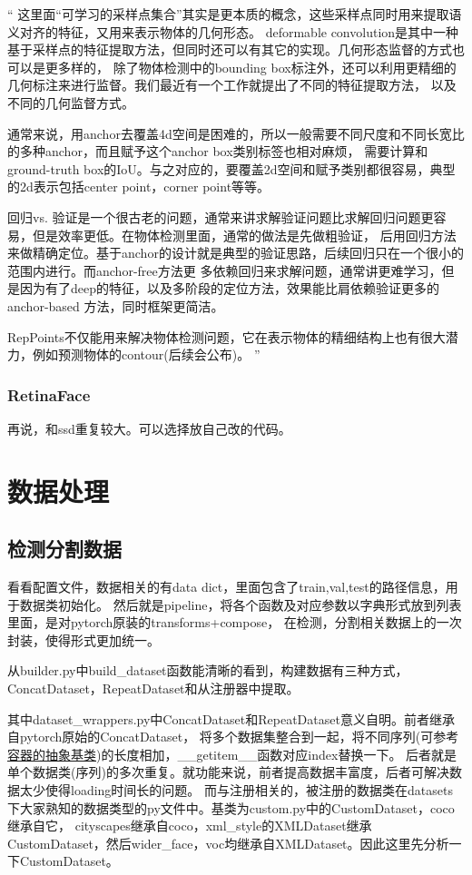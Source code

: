 \documentclass[UTF8]{ctexart}
\begin{document}
“
这里面“可学习的采样点集合”其实是更本质的概念，这些采样点同时用来提取语义对齐的特征，又用来表示物体的几何形态。
deformable convolution是其中一种基于采样点的特征提取方法，但同时还可以有其它的实现。几何形态监督的方式也可以是更多样的，
除了物体检测中的bounding box标注外，还可以利用更精细的几何标注来进行监督。我们最近有一个工作就提出了不同的特征提取方法，
以及不同的几何监督方式。

通常来说，用anchor去覆盖4d空间是困难的，所以一般需要不同尺度和不同长宽比的多种anchor，而且赋予这个anchor box类别标签也相对麻烦，
需要计算和ground-truth box的IoU。与之对应的，要覆盖2d空间和赋予类别都很容易，典型的2d表示包括center point，corner point等等。

回归vs. 验证是一个很古老的问题，通常来讲求解验证问题比求解回归问题更容易，但是效率更低。在物体检测里面，通常的做法是先做粗验证，
后用回归方法来做精确定位。基于anchor的设计就是典型的验证思路，后续回归只在一个很小的范围内进行。而anchor-free方法更
多依赖回归来求解问题，通常讲更难学习，但是因为有了deep的特征，以及多阶段的定位方法，效果能比肩依赖验证更多的anchor-based
方法，同时框架更简洁。

RepPoints不仅能用来解决物体检测问题，它在表示物体的精细结构上也有很大潜力，例如预测物体的contour(后续会公布)。
”


\subsubsection{RetinaFace}
再说，和ssd重复较大。可以选择放自己改的代码。

\section{数据处理}
\label{sec:detail}
\subsection{检测分割数据}
看看配置文件，数据相关的有data dict，里面包含了train,val,test的路径信息，用于数据类初始化。
然后就是pipeline，将各个函数及对应参数以字典形式放到列表里面，是对pytorch原装的transforms+compose，
在检测，分割相关数据上的一次封装，使得形式更加统一。

从builder.py中build\_dataset函数能清晰的看到，构建数据有三种方式，ConcatDataset，RepeatDataset和从注册器中提取。

其中dataset\_wrappers.py中ConcatDataset和RepeatDataset意义自明。前者继承自pytorch原始的ConcatDataset，
将多个数据集整合到一起，将不同序列(可参考\href{https://docs.python.org/zh-cn/3/library/collections.abc.html}
{容器的抽象基类})的长度相加，\_\_getitem\_\_函数对应index替换一下。
后者就是单个数据类(序列)的多次重复。就功能来说，前者提高数据丰富度，后者可解决数据太少使得loading时间长的问题。
而与注册相关的，被注册的数据类在datasets下大家熟知的数据类型的py文件中。基类为custom.py中的CustomDataset，coco继承自它，
cityscapes继承自coco，xml\_style的XMLDataset继承CustomDataset，然后wider\_face，voc均继承自XMLDataset。因此这里先分析一下CustomDataset。
\end{document}
